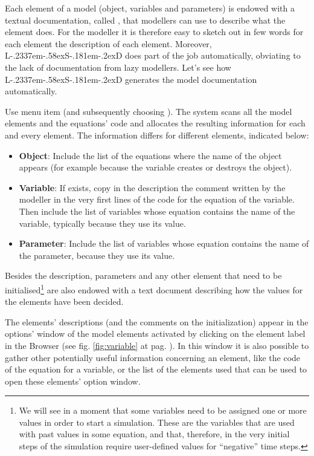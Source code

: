 \documentclass [11pt,a4paper] {book}
\def\LsD{{L\kern-.2337em\lower-.58ex\hbox{S}\kern-.181em\lower-.2ex\hbox{D}}\xspace}
\begin{document}
Each element of a model (object, variables and parameters) is endowed with a textual
documentation, called , that modellers can use to describe what the
element does. For the modeller it is therefore easy to sketch out in few words for each
element the description of each element. Moreover, \LsD does part of the job
automatically, obviating to the lack of documentation from lazy modellers. Let's see how
\LsD generates the model documentation automatically.

Use menu item  (and subsequently choosing
). The system scans all the model elements and the equations' code and
allocates the resulting information for each and every element. The information differs
for different elements, indicated below:

\begin{itemize}
  \item \textbf{Object}: Include the list of the equations where the name of the object appears (for
  example because the variable creates or destroys the object).
  \item \textbf{Variable}: If exists, copy in the description the comment written by the
  modeller in the very first lines of the code for the equation of the variable. Then
  include the list of variables whose equation contains the name of the variable,
  typically because they use its value.
  \item \textbf{Parameter}: Include the list of variables whose equation contains the name of the parameter,
  because they use its value.
\end{itemize}


 Besides the description, parameters and any other element that need to be
initialised\footnote{We will see in a moment that some variables need to be assigned one
or more values in order to start a simulation. These are the variables that are used with
past values in some equation, and that, therefore, in the very initial steps of the
simulation require user-defined values for ``negative'' time steps.} are also endowed
with a text document describing how the values for the elements have been decided.

The elements' descriptions (and the comments on the initialization) appear in the
options' window of the model elements activated by clicking on the element label in the
Browser (see fig. \ref{fig:variable} at pag. \pageref{fig:variable}). In this window it
is also possible to gather other potentially useful information concerning an element,
like the code of the equation for a variable, or the list of the elements used that can
be used to open these elements' option window.
\end{document}
